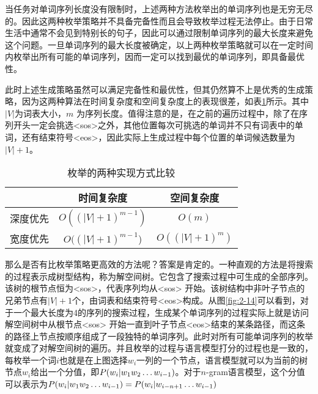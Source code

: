 \parinterval 当任务对单词序列长度没有限制时，上述两种方法枚举出的单词序列也是无穷无尽的。因此这两种枚举策略并不具备完备性而且会导致枚举过程无法停止。由于日常生活中通常不会见到特别长的句子，因此可以通过限制单词序列的最大长度来避免这个问题。一旦单词序列的最大长度被确定，以上两种枚举策略就可以在一定时间内枚举出所有可能的单词序列，因而一定可以找到最优的单词序列，即具备最优性。

\parinterval 此时上述生成策略虽然可以满足完备性和最优性，但其仍然算不上是优秀的生成策略，因为这两种算法在时间复杂度和空间复杂度上的表现很差，如表\ref{tab:2-3}所示。其中$|V|$为词表大小，$m$ 为序列长度。值得注意的是，在之前的遍历过程中，除了在序列开头一定会挑选<sos>之外，其他位置每次可挑选的单词并不只有词表中的单词，还有结束符号<eos>，因此实际上生成过程中每个位置的单词候选数量为$|V|+1$。

\vspace{0.5em}
\begin{table}[htp]{
\begin{center}
\caption{枚举的两种实现方式比较}
{
\begin{tabular}{c|c|c}
\rule{0pt}{10pt} & 时间复杂度 & 空间复杂度\\ \hline
\rule{0pt}{10pt} 深度优先 & $O({(|V|+1)}^{m-1})$ & $O(m)$ \\
\rule{0pt}{10pt} 宽度优先 & $O({(|V|+1)}^{m-1}$) & $O({(|V|+1)}^{m})$ \\
\end{tabular}
\label{tab:2-3}
}
\end{center}
}\end{table}

\parinterval 那么是否有比枚举策略更高效的方法呢？答案是肯定的。一种直观的方法是将搜索的过程表示成树型结构，称为解空间树。它包含了搜索过程中可生成的全部序列。该树的根节点恒为<sos>，代表序列均从<sos> 开始。该树结构中非叶子节点的兄弟节点有$|V|+1$个，由词表和结束符号<eos>构成。从图\ref{fig:2-14}可以看到，对于一个最大长度为4的序列的搜索过程，生成某个单词序列的过程实际上就是访问解空间树中从根节点<sos> 开始一直到叶子节点<eos>结束的某条路径，而这条的路径上节点按顺序组成了一段独特的单词序列。此时对所有可能单词序列的枚举就变成了对解空间树的遍历。并且枚举的过程与语言模型打分的过程也是一致的，每枚举一个词$i$也就是在上图选择$w_i$一列的一个节点，语言模型就可以为当前的树节点$w_i$给出一个分值，即${P}(w_i | w_1 w_2 \ldots w_{i-1})$。对于$n$-gram语言模型，这个分值可以表示为${P}(w_i | w_1 w_2 \ldots w_{i-1})={P}(w_i | w_{i-n+1} \ldots w_{i-1})$

